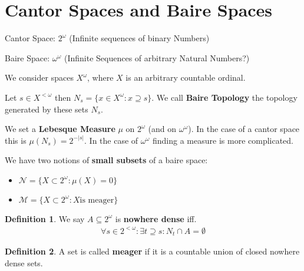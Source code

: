\documentclass{report}
\newcommand*{\newpar}{\par\vspace{\baselineskip}\noindent}
\newcommand{\tbf}[1]{\textbf{#1}}
\begin{document}
\newtheorem{lemma}{Lemma}[chapter]
\newtheorem{theorem}[lemma]{Satz}
\newtheorem{proposition}[lemma]{Proposition}
\newtheorem{corollary}[lemma]{Korollar}



\theoremstyle{definition}
\newtheorem{definition}[lemma]{Definition}
\newtheorem{beispiel}[lemma]{Beispiel}
\newtheorem{beobachtung}[lemma]{Beobachtung}
\newtheorem{anmerkung}[lemma]{Anmerkung}
\newtheorem{question}[lemma]{Frage}
\newtheorem{application}[lemma]{Anwendung}
\newtheorem{konsequenz}[lemma]{Konsequenz}
%
%
%

\tableofcontents
\thispagestyle{fancy}
\clearpage
%
%
%
%
%
%
%
%
%
\section{Cantor Spaces and Baire Spaces}
Cantor Space: $2^\omega$ (Infinite sequences of binary Numbers)
\newpar
Baire Space: $\omega^\omega$ (Infinite Sequences of arbitrary Natural Numbers?)
\newpar
We consider spaces $X^\omega$, where $X$ is an arbitrary countable ordinal.
\newpar
Let $s \in X^{<\omega}$ then $N_s = \{x \in X^\omega : x \supseteq s\}$. We call \tbf{Baire Topology} the topology generated by these sets $N_s$.
\newpar
We set a \tbf{Lebesque Measure} $\mu$ on $2^\omega$ (and on $\omega^\omega$). In the case of a cantor space this is $\mu(N_s) = 2^{-|s|}$. In the case of $\omega^\omega$ finding a measure is more complicated.
\newpar
We have two notions of \tbf{small subsets} of a baire space:
\begin{itemize}
 \item $\mathcal{N} = \{X \subset 2^\omega : \mu(X) = 0\}$
 \item $\mathcal{M} = \{X \subset 2^\omega : X \text{is meager}\}$
\end{itemize}
%
\begin{definition}
 We say $A \subseteq 2^\omega$ is \tbf{nowhere dense} iff. 
 \begin{align*}
  \forall s \in 2^{<\omega} : \exists t \supseteq s : N_t \cap A = \emptyset
 \end{align*}
\end{definition}
\begin{definition}
 A set is called \tbf{meager} if it is a countable union of closed nowhere dense sets.
\end{definition}
%
\end{document}
